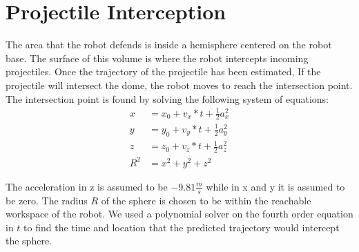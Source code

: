\documentclass[12pt,a4paper,notitlepage]{report}
\begin{document}
\section*{Projectile Interception}
The area that the robot defends is inside a hemisphere centered on the robot base.
 The surface of this volume is where the robot intercepts incoming projectiles. Once the trajectory of the projectile has been estimated,
  If the projectile will intersect the dome, the robot moves to reach the intersection
   point. The intersection point is found by solving the following system of equations:
\begin{align*}
x &= x_0+v_x*t+\frac{1}{2}a_x^2\\
y &= y_0+v_y*t+\frac{1}{2}a_y^2\\
z &= z_0+v_z*t+\frac{1}{2}a_z^2\\
R^2 &= x^2+y^2+z^2
\end{align*}

The acceleration in z is assumed to be $-9.81 \frac{m}{s}$ while in x and y it
 is assumed to be zero. The radius $R$ of the sphere is chosen to be within the reachable workspace of the robot. We used a polynomial solver 
 on the fourth order equation in $t$ to find the time and location
  that the predicted trajectory would intercept the sphere.
 
  
\end{document}
